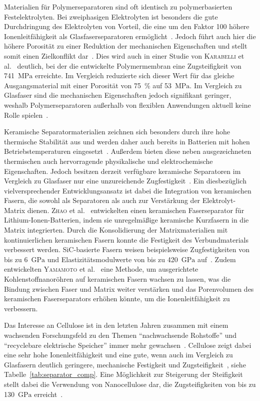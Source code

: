 Materialien für Polymerseparatoren sind oft identisch zu polymerbasierten Festelektrolyten. Bei zweiphasigen Elektrolyten ist besonders die gute Durchdringung des Elektrolyten von Vorteil, die eine um den Faktor 100 höhere Ionenleitfähigkeit als Glasfaserseparatoren ermöglicht~\cite{Wang2021a}. Jedoch führt auch hier die höhere Porosität zu einer Reduktion der mechanischen Eigenschaften und stellt somit einen Zielkonflikt dar~\cite{Ahankari2022}. Dies wird auch in einer Studie von \textsc{Karabelli} et al.~\cite{Karabelli2011} deutlich, bei der die entwickelte Polymermembran eine Zugsteifigkeit von 741~$\si{\MPa}$ erreichte. Im Vergleich reduzierte sich dieser Wert für das gleiche Ausgangsmaterial mit einer Porosität von 75~\% auf 53~$\si{\MPa}$. Im Vergleich zu Glasfaser sind die mechanischen Eigenschaften jedoch signifikant geringer, weshalb Polymerseparatoren außerhalb von flexiblen Anwendungen aktuell keine Rolle spielen~\cite{Zschiebsch2024}.

Keramische Separatormaterialien zeichnen sich besonders durch ihre hohe thermische Stabilität aus und werden daher auch bereits in Batterien mit hohen Betriebstemperaturen eingesetzt~\cite{Qin2017,Cheong2012}. Außerdem bieten diese neben ausgezeichneten thermischen auch hervorragende physikalische und elektrochemische Eigenschaften. Jedoch besitzen derzeit verfügbare keramische Separatoren im Vergleich zu Glasfaser nur eine unzureichende Zugfestigkeit~\cite{Qin2017}. Ein diesbezüglich vielversprechender Entwicklungsansatz ist dabei die Integration von keramischen Fasern, die sowohl als Separatoren als auch zur Verstärkung der Elektrolyt-Matrix dienen. \textsc{Zhao} et al.~\cite{Zhao2017} entwickelten einen keramischen Faserseparator für Lithium-Ionen-Batterien, indem sie unregelmäßige keramische Kurzfasern in die Matrix integrierten. Durch die Konsolidierung der Matrixmaterialien mit kontinuierlichen keramischen Fasern konnte die Festigkeit des Verbundmaterials verbessert werden. SiC-basierte Fasern weisen beispielsweise Zugfestigkeiten von bis zu 6~$\si{\GPa}$ und Elastizitätsmodulwerte von bis zu 420~$\si{\GPa}$ auf~\cite{Seydibeyoglu2017}. Zudem entwickelten \textsc{Yamamoto} et al.~\cite{Yamamoto2009} eine Methode, um ausgerichtete Kohlenstoffnanoröhren auf keramischen Fasern wachsen zu lassen, was die Bindung zwischen Faser und Matrix weiter verstärken und das Porenvolumen des keramischen Faserseparators erhöhen könnte, um die Ionenleitfähigkeit zu verbessern.

Das Interesse an Cellulose ist in den letzten Jahren zusammen mit einem wachsenden Forschungsfeld zu den Themen "`nachwachsende Rohstoffe"' und "`recyclebare elektrische Speicher"' immer mehr gewachsen~\cite{Liang2018,Teng2020}. Cellulose zeigt dabei eine sehr hohe Ionenleitfähigkeit und eine gute, wenn auch im Vergleich zu Glasfasern deutlich geringere, mechanische Festigkeit und Zugsteifigkeit~\cite{Xu2020}, siehe Tabelle~\ref{tab:separator_comp}. Eine Möglichkeit zur Steigerung der Steifigkeit stellt dabei die Verwendung von Nanocellulose dar, die Zugsteifigkeiten von bis zu 130~$\si{\GPa}$ erreicht~\cite{Dufresne2013,Zhang2019}.

